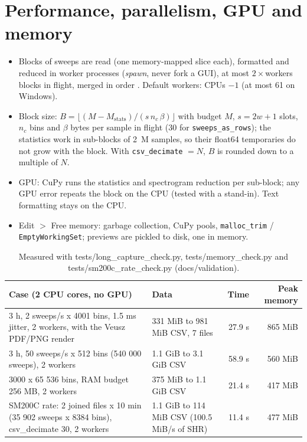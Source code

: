 \documentclass[11pt,a4paper]{article}
\newcommand{\code}[1]{\texttt{#1}}
\begin{document}
\section{Performance, parallelism, GPU and memory}
\begin{itemize}[nosep]
\item Blocks of sweeps are read (one memory-mapped slice each), formatted and reduced in worker processes
      (\emph{spawn}, never fork a GUI), at most $2\times$workers blocks in flight, merged in order \cite{r7}.
      Default workers: CPUs $-1$ (at most 61 on Windows).
\item Block size: $B=\lfloor (M-M_\mathrm{stats})/(s\,n_c\,\beta)\rfloor$ with budget $M$, $s=2w+1$ slots,
      $n_c$ bins and $\beta$ bytes per sample in flight (30 for \code{sweeps\_as\_rows}); the statistics
      work in sub-blocks of 2~M samples, so their float64 temporaries do not grow with the block. With
      \code{csv\_decimate} $=N$, $B$ is rounded down to a multiple of $N$.
\item GPU: CuPy \cite{r8} runs the statistics and spectrogram reduction per sub-block; any GPU error repeats
      the block on the CPU (tested with a stand-in). Text formatting stays on the CPU.
\item Edit $>$ Free memory: garbage collection, CuPy pools, \code{malloc\_trim} / \code{EmptyWorkingSet};
      previews are pickled to disk, one in memory.
\end{itemize}
\begin{longtable}{p{6.2cm}p{4.2cm}rr}
\caption{Measured with tests/long\_capture\_check.py, tests/memory\_check.py and tests/sm200c\_rate\_check.py (docs/validation).}\\
\toprule
\textbf{Case (2 CPU cores, no GPU)} & \textbf{Data} & \textbf{Time} & \textbf{Peak memory}\\
\midrule
\endhead
3 h, 2 sweeps/s x 4001 bins, 1.5 ms jitter, 2 workers, with the Veusz PDF/PNG render & 331 MiB to 981 MiB CSV, 7 files & 27.9 s & 865 MiB\\
3 h, 50 sweeps/s x 512 bins (540 000 sweeps), 2 workers & 1.1 GiB to 3.1 GiB CSV & 58.9 s & 560 MiB\\
3000 x 65 536 bins, RAM budget 256 MB, 2 workers & 375 MiB to 1.1 GiB CSV & 21.4 s & 417 MiB\\
SM200C rate: 2 joined files x 10 min (35 902 sweeps x 8384 bins), csv\_decimate 30, 2 workers & 1.1 GiB to 114 MiB CSV (100.5 MiB/s of SHR) & 11.4 s & 477 MiB\\
\bottomrule
\end{longtable}
\end{document}
